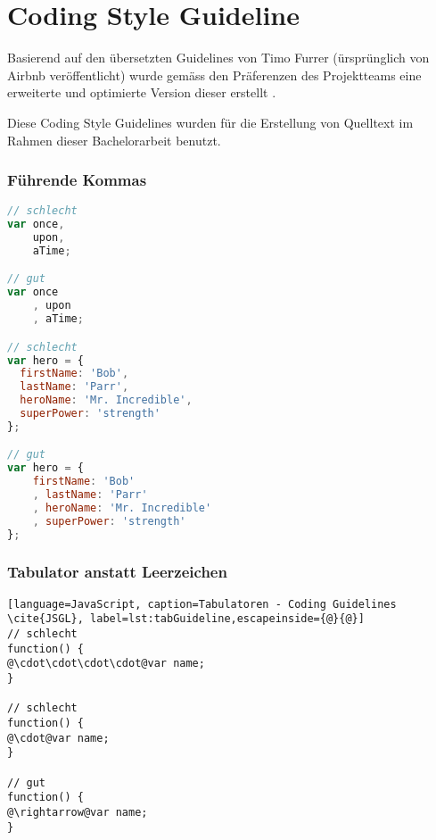 \chapter{Coding Style Guideline}
\label{sec:coding-guidelines}
Basierend auf den übersetzten Guidelines von Timo Furrer \cite{JSGLDe} (ürsprünglich von Airbnb \cite{JSGLOrigin} veröffentlicht) wurde gemäss den Präferenzen des Projektteams eine erweiterte und optimierte Version dieser erstellt \cite{JSGL}.

Diese Coding Style Guidelines wurden für die Erstellung von Quelltext im Rahmen dieser Bachelorarbeit benutzt.

\subsection*{Führende Kommas}
\begin{lstlisting}[language=JavaScript, caption=Führende Kommas - Coding Guidelines \cite{JSGL}, label=lst:leadingCommas]
// schlecht
var once,
    upon,
    aTime;

// gut
var once
    , upon
    , aTime;

// schlecht
var hero = {
  firstName: 'Bob',
  lastName: 'Parr',
  heroName: 'Mr. Incredible',
  superPower: 'strength'
};

// gut
var hero = {
    firstName: 'Bob'
    , lastName: 'Parr'
    , heroName: 'Mr. Incredible'
    , superPower: 'strength'
};
\end{lstlisting}

\subsection*{Tabulator anstatt Leerzeichen}
\begin{lstlisting}[language=JavaScript, caption=Tabulatoren - Coding Guidelines \cite{JSGL}, label=lst:tabGuideline,escapeinside={@}{@}]
// schlecht
function() {
@\cdot\cdot\cdot\cdot@var name;
}

// schlecht
function() {
@\cdot@var name;
}

// gut
function() {
@\rightarrow@var name;
}
\end{lstlisting}
